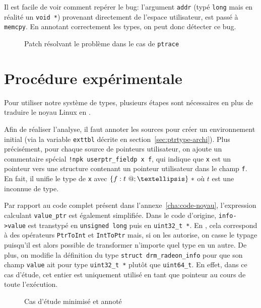 Il est facile de voir comment repérer le bug: l'argument \texttt{addr} (typé
\texttt{long} mais en réalité un \texttt{void *}) provenant directement de
l'espace utilisateur, est passé à \texttt{memcpy}. En annotant correctement les
types, on peut donc détecter ce bug.

\begin{figure}
        \caption{Patch résolvant le problème dans le cas de \texttt{ptrace}}
        \label{fig:blackfin-patch}
\end{figure}


\section{Procédure expérimentale}
\label{sec:demo-unif}

Pour utiliser notre système de types, plusieurs étapes sont nécessaires en plus
de traduire le noyau Linux en \langname{}.

Afin de réaliser l'analyse, il faut annoter les sources pour créer un
environnement initial (via la variable \texttt{exttbl} décrite en
section~\ref{sec:ptrtype-archi}). Plus précisément, pour chaque source de
pointeurs utilisateur, on ajoute un commentaire spécial \texttt{!npk
userptr\_fieldp x f}, qui indique que \texttt{x} est un pointeur vers une
structure contenant un pointeur utilisateur dans le champ \texttt{f}. En fait,
il unifie le type de \texttt{x} avec $\{ f: \ptrU{t} ; … \}~*$ où $t$ est une
inconnue de type.

Par rapport au code complet présent dans l'annexe~\ref{cha:code-noyau},
l'expression calculant \texttt{value_ptr} est également simplifiée. Dans le code
d'origine, \texttt{info->value} est transtypé en \texttt{unsigned long} puis en
\texttt{uint32\_t *}. En \newspeak, cela correspond à des opérateurs
\texttt{PtrToInt} \linebreak et \texttt{IntToPtr} mais, si on les autorise, on
casse le typage puisqu'il est alors possible de transformer n'importe quel type
en un autre. De plus, on modifie la définition du type \texttt{struct
drm\_radeon\_info} pour que son champ \texttt{value} ait pour type
\texttt{uint32\_t *} plutôt que \texttt{uint64\_t}. En effet, dans ce cas
d'étude, cet entier est uniquement utilisé en tant que pointeur au cours de
toute l'exécution.

\begin{figure}

\caption{Cas d'étude minimisé et annoté}
\label{fig:ex-drm}
\end{figure}

